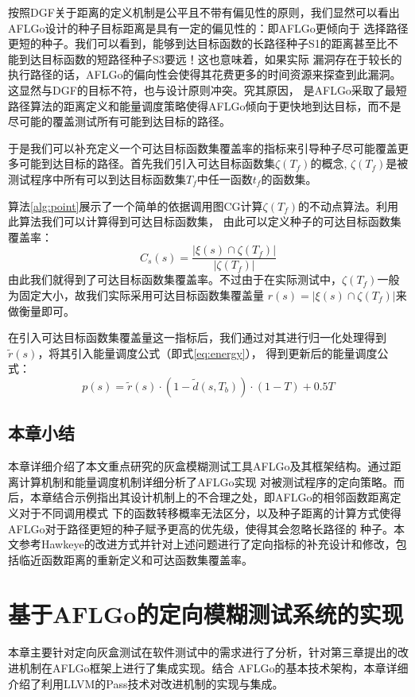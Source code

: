 \documentclass[bachelor]{njupthesis}
\begin{document}
按照DGF关于距离的定义机制是公平且不带有偏见性的原则，我们显然可以看出AFLGo设计的种子目标距离是具有一定的偏见性的：即AFLGo更倾向于
选择路径更短的种子。我们可以看到，能够到达目标函数的长路径种子S1的距离甚至比不能到达目标函数的短路径种子S3要远！这也意味着，如果实际
漏洞存在于较长的执行路径的话，AFLGo的偏向性会使得其花费更多的时间资源来探查到此漏洞。这显然与DGF的目标不符，也与设计原则冲突。究其原因，
是AFLGo采取了最短路径算法的距离定义和能量调度策略使得AFLGo倾向于更快地到达目标，而不是尽可能的覆盖测试所有可能到达目标的路径。

于是我们可以补充定义一个可达目标函数集覆盖率的指标来引导种子尽可能覆盖更多可能到达目标的路径。首先我们引入可达目标函数集$\zeta(T_f)$的概念,
$\zeta(T_f)$是被测试程序中所有可以到达目标函数集$T_f$中任一函数$t_f$的函数集。

算法\ref{alg:point}展示了一个简单的依据调用图CG计算$\zeta(T_f)$的不动点算法。利用此算法我们可以计算得到可达目标函数集，
由此可以定义种子的可达目标函数集覆盖率：
\begin{equation}
	C_s(s)=\frac{|\xi(s) \cap \zeta(T_f)|}{|\zeta(T_f)|}
\end{equation}
由此我们就得到了可达目标函数集覆盖率。不过由于在实际测试中，$\zeta(T_f)$一般为固定大小，故我们实际采用可达目标函数集覆盖量
$r(s)=|\xi(s) \cap \zeta(T_f)|$来做衡量即可。

在引入可达目标函数集覆盖量这一指标后，我们通过对其进行归一化处理得到$\widetilde{r}(s)$，将其引入能量调度公式（即式\ref{eq:energy}），
得到更新后的能量调度公式：
\begin{equation}
	p(s)=\widetilde{r}(s) \cdot (1-\widetilde{d}(s,T_b))\cdot(1-T)+0.5T
\end{equation}

\section{本章小结}
本章详细介绍了本文重点研究的灰盒模糊测试工具AFLGo及其框架结构。通过距离计算机制和能量调度机制详细分析了AFLGo实现
对被测试程序的定向策略。而后，本章结合示例指出其设计机制上的不合理之处，即AFLGo的相邻函数距离定义对于不同调用模式
下的函数转移概率无法区分，以及种子距离的计算方式使得AFLGo对于路径更短的种子赋予更高的优先级，使得其会忽略长路径的
种子。本文参考Hawkeye的改进方式并针对上述问题进行了定向指标的补充设计和修改，包括临近函数距离的重新定义和可达函数集覆盖率。

\chapter{基于AFLGo的定向模糊测试系统的实现}
本章主要针对定向灰盒测试在软件测试中的需求进行了分析，针对第三章提出的改进机制在AFLGo框架上进行了集成实现。结合
AFLGo的基本技术架构，本章详细介绍了利用LLVM的Pass技术对改进机制的实现与集成。
\end{document}
